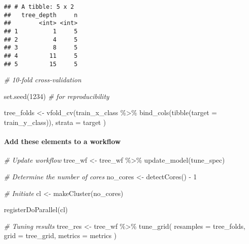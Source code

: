 \documentclass[
]{book}
\newenvironment{Shaded}{\begin{snugshade}}{\end{snugshade}}
\newcommand{\AttributeTok}[1]{\textcolor[rgb]{0.77,0.63,0.00}{#1}}
\newcommand{\CommentTok}[1]{\textcolor[rgb]{0.56,0.35,0.01}{\textit{#1}}}
\newcommand{\DecValTok}[1]{\textcolor[rgb]{0.00,0.00,0.81}{#1}}
\newcommand{\FunctionTok}[1]{\textcolor[rgb]{0.00,0.00,0.00}{#1}}
\newcommand{\NormalTok}[1]{#1}
\newcommand{\OtherTok}[1]{\textcolor[rgb]{0.56,0.35,0.01}{#1}}
\newcommand{\SpecialCharTok}[1]{\textcolor[rgb]{0.00,0.00,0.00}{#1}}
\begin{document}
\begin{verbatim}
## # A tibble: 5 x 2
##   tree_depth     n
##        <int> <int>
## 1          1     5
## 2          4     5
## 3          8     5
## 4         11     5
## 5         15     5
\end{verbatim}

\begin{Shaded}
\begin{Highlighting}[]
\CommentTok{\# 10{-}fold cross{-}validation}

\FunctionTok{set.seed}\NormalTok{(}\DecValTok{1234}\NormalTok{) }\CommentTok{\# for reproducibility}

\NormalTok{tree\_folds }\OtherTok{\textless{}{-}} \FunctionTok{vfold\_cv}\NormalTok{(train\_x\_class }\SpecialCharTok{\%\textgreater{}\%} \FunctionTok{bind\_cols}\NormalTok{(}\FunctionTok{tibble}\NormalTok{(}\AttributeTok{target =}\NormalTok{ train\_y\_class)),}
  \AttributeTok{strata =}\NormalTok{ target}
\NormalTok{)}
\end{Highlighting}
\end{Shaded}

\hypertarget{add-these-elements-to-a-workflow-1}{%
\paragraph{Add these elements to a workflow}\label{add-these-elements-to-a-workflow-1}}

\begin{Shaded}
\begin{Highlighting}[]
\CommentTok{\# Update workflow}
\NormalTok{tree\_wf }\OtherTok{\textless{}{-}}\NormalTok{ tree\_wf }\SpecialCharTok{\%\textgreater{}\%} \FunctionTok{update\_model}\NormalTok{(tune\_spec)}

\CommentTok{\# Determine the number of cores}
\NormalTok{no\_cores }\OtherTok{\textless{}{-}} \FunctionTok{detectCores}\NormalTok{() }\SpecialCharTok{{-}} \DecValTok{1}

\CommentTok{\# Initiate}
\NormalTok{cl }\OtherTok{\textless{}{-}} \FunctionTok{makeCluster}\NormalTok{(no\_cores)}

\FunctionTok{registerDoParallel}\NormalTok{(cl)}

\CommentTok{\# Tuning results}
\NormalTok{tree\_res }\OtherTok{\textless{}{-}}\NormalTok{ tree\_wf }\SpecialCharTok{\%\textgreater{}\%}
  \FunctionTok{tune\_grid}\NormalTok{(}
    \AttributeTok{resamples =}\NormalTok{ tree\_folds,}
    \AttributeTok{grid =}\NormalTok{ tree\_grid,}
    \AttributeTok{metrics =}\NormalTok{ metrics}
\NormalTok{  )}
\end{Highlighting}
\end{Shaded}
\end{document}
